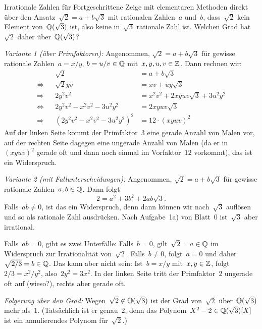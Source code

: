 \documentclass{algblatt}
\begin{document}
\begin{aufgabe}{Irrationale Zahlen für Fortgeschrittene}
Zeige mit elementaren Methoden direkt über den Ansatz~$\sqrt{2} = a +
b\sqrt{3}$ mit rationalen Zahlen~$a$ und~$b$, dass~$\sqrt{2}$ kein Element
von~$\mathbb{Q}(\sqrt{3})$ ist, also keine in~$\sqrt{3}$ rationale Zahl ist. Welchen
Grad hat~$\sqrt{2}$ daher über~$\mathbb{Q}(\sqrt{3})$?

\begin{loesung}
\emph{Variante 1 (über Primfaktoren):} Angenommen, $\sqrt{2} = a + b \sqrt{3}$
für gewisse rationale Zahlen~$a = x/y$, $b = u/v \in \mathbb{Q}$ mit~$x,y,u,v \in
\mathbb{Z}$. Dann rechnen wir:
\begin{align*}
  && \sqrt{2} &= a + b \sqrt{3} \\
  \Longleftrightarrow && \sqrt{2} y v &= xv + uy \sqrt{3} \\
  \Longrightarrow && 2 y^2 v^2 &= x^2 v^2 + 2 xyuv \sqrt{3} + 3 u^2 y^2 \\
  \Longleftrightarrow && 2 y^2 v^2 - x^2 v^2 - 3 u^2 y^2 &= 2 xyuv \sqrt{3} \\
  \Longrightarrow && (2 y^2 v^2 - x^2 v^2 - 3 u^2 y^2)^2 &= 12 \cdot (xyuv)^2
\end{align*}
Auf der linken Seite kommt der Primfaktor~$3$ eine gerade Anzahl von Malen vor,
auf der rechten Seite dagegen eine ungerade Anzahl von Malen (da er
in~$(xyuv)^2$ gerade oft und dann noch einmal im Vorfaktor~$12$ vorkommt), das
ist ein Widerspruch.

\emph{Variante 2 (mit Fallunterscheidungen):} Angenommen, $\sqrt{2} = a + b
\sqrt{3}$ für gewisse rationale Zahlen~$a, b \in \mathbb{Q}$. Dann folgt
\[ 2 = a^2 + 3b^2 + 2ab \sqrt{3}. \]
Falls~$ab \neq 0$, ist das ein Widerspruch, denn dann können wir
nach~$\sqrt{3}$ auflösen und so als rationale Zahl ausdrücken. Nach Aufgabe~1a)
von Blatt~0 ist~$\sqrt{3}$ aber irrational.

Falls~$ab = 0$, gibt es zwei Unterfälle: Falls~$b = 0$, gilt~$\sqrt{2} = a \in
\mathbb{Q}$ im Widerspruch zur Irrationalität von~$\sqrt{2}$. Falls~$b \neq 0$,
folgt~$a = 0$ und daher~$\sqrt{2/3} = b \in \mathbb{Q}$. Das kann aber nicht sein:
Ist~$b = x/y$ mit~$x,y \in \mathbb{Z}$, folgt~$2/3 = x^2/y^2$, also~$2y^2 = 3x^2$. In
der linken Seite tritt der Primfaktor~$2$ ungerade oft auf (wieso?), rechts
aber gerade oft.

\emph{Folgerung über den Grad:} Wegen~$\sqrt{2} \not\in \mathbb{Q}(\sqrt{3})$ ist der
Grad von~$\sqrt{2}$ über~$\mathbb{Q}(\sqrt{3})$ mehr als~$1$. (Tatsächlich ist er
genau~$2$, denn das Polynom~$X^2 - 2 \in \mathbb{Q}(\sqrt{3})[X]$ ist ein
annulierendes Polynom für~$\sqrt{2}$.)
\end{loesung}
\end{aufgabe}
\end{document}
